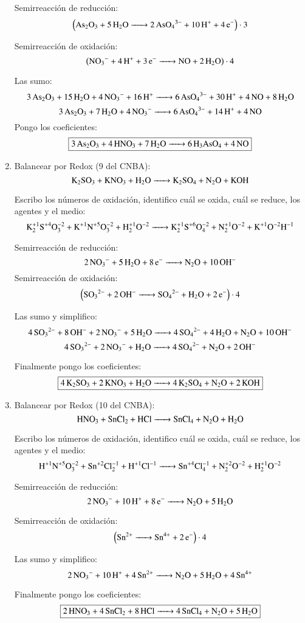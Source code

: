 \begin{enumerate}

\begin{multicols}{2}
Semirreacción de reducción:
$$\left(\ce{
As2O3 + 5H2O -> 2AsO4^{3-} + 10H^+ +4e^-
}\right)\cdot 3$$

Semirreacción de oxidación:
$$\left(\ce{
NO_3^{-} + 4H^+ +3e^- -> NO + 2H2O
}\right)\cdot 4$$
\end{multicols}

Las sumo:
$$\ce{
3As2O3 + 15H2O + 4NO3^- + 16H^+ -> 6AsO_4^{3-} + 30H^+ + 4NO + 8 H2O
}$$
$$\ce{
3As2O3 + 7H2O + 4NO3^- -> 6AsO_4^{3-} + 14H^+ + 4NO
}$$
Pongo los coeficientes:
$$\fbox{\ce{
3As2O3 + 4HNO3 + 7H2O -> 6H3AsO4 + 4NO}}$$


\newpage
\item
Balancear por Redox (9 del CNBA):
$$\ce{K2SO3 + KNO3 + H2O ->
K2SO4 + N2O + KOH}$$

Escribo los números de oxidación, identifico cuál se oxida, cuál se reduce, los agentes y el medio:
$$\ce{
K^{+1}2S^{+4}O^{-2}3 + K^{+1}N^{+5}O^{-2}3 + H^{+1}2O^{-2} ->
K^{+1}2S^{+6}O^{-2}4 + N^{+1}2O^{-2} + K^{+1}O^{-2}H^{-1}
}$$


\begin{multicols}{2}
Semirreacción de reducción:
$$\ce{
2NO_3^{-} + 5 H2O + 8e^- ->
N2O + 10OH^-
}$$
Semirreacción de oxidación:
$$\left(\ce{
SO3^{2-} + 2OH^- ->
SO4^{2-} + H2O + 2e^-
}\right)\cdot 4$$
\end{multicols}

Las sumo y simplifico:
$$\ce{
4SO3^{2-} + 8OH^- + 2NO_3^- + 5H2O ->
4SO_4^{2-} + 4 H2O + N2O + 10OH^-
}$$
$$\ce{
4SO3^{2-} + 2NO_3^- + H2O ->
4SO_4^{2-} + N2O + 2OH^-
}$$

Finalmente pongo los coeficientes:
$$\fbox{\ce{4K2SO3 + 2KNO3 + H2O ->
4K2SO4 + N2O + 2KOH}}$$


\item
Balancear por Redox (10 del CNBA):
$$\ce{
HNO3 + SnCl2 + HCl ->
SnCl4 + N2O + H2O
}$$

Escribo los números de oxidación, identifico cuál se oxida, cuál se reduce, los agentes y el medio:
$$\ce{
H^{+1}N^{+5}O^{-2}3 + Sn^{+2}Cl^{-1}2 + H^{+1}Cl^{-1} ->
Sn^{+4}Cl^{-1}4 + N^{+2}2O^{-2} + H^{+1}2O^{-2}
}$$


\begin{multicols}{2}
Semirreacción de reducción:
$$\ce{
2NO_3^- +10H^+ + 8e^- ->
N2O + 5H2O
}$$

Semirreacción de oxidación:
$$\left(\ce{
Sn^{2+} ->
Sn^{4+} + 2e^-
}\right)\cdot 4$$
\end{multicols}

Las sumo y simplifico:
$$\ce{
2NO_3^- + 10H^+ + 4Sn^{2+} ->
N2O + 5H2O + 4Sn^{4+}
}$$

Finalmente pongo los coeficientes:
$$\fbox{\ce{
2HNO3 + 4SnCl2 + 8HCl ->
4SnCl4 + N2O + 5H2O
}}$$
\end{enumerate}

